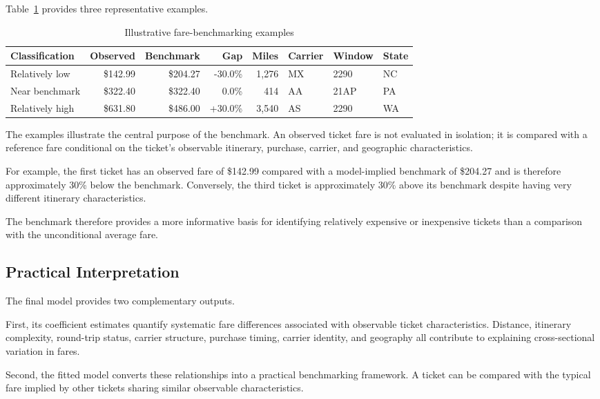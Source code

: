 \documentclass[11pt,a4paper]{article}
\begin{document}
Table~\ref{tab:benchmark-examples} provides three representative examples.

\begin{table}[H]
\centering
\caption{Illustrative fare-benchmarking examples}
\label{tab:benchmark-examples}
\small
\begin{tabular}{lrrrrlll}
\toprule
\textbf{Classification} & \textbf{Observed} & \textbf{Benchmark} & \textbf{Gap} & \textbf{Miles} & \textbf{Carrier} & \textbf{Window} & \textbf{State} \\
\midrule
Relatively low & \$142.99 & \$204.27 & -30.0\% & 1,276 & MX & 2290 & NC \\
Near benchmark & \$322.40 & \$322.40 & 0.0\% & 414 & AA & 21AP & PA \\
Relatively high & \$631.80 & \$486.00 & +30.0\% & 3,540 & AS & 2290 & WA \\
\bottomrule
\end{tabular}
\end{table}

The examples illustrate the central purpose of the benchmark. An observed ticket fare is not evaluated in isolation; it is compared with a reference fare conditional on the ticket's observable itinerary, purchase, carrier, and geographic characteristics.

For example, the first ticket has an observed fare of \$142.99 compared with a model-implied benchmark of \$204.27 and is therefore approximately 30\% below the benchmark. Conversely, the third ticket is approximately 30\% above its benchmark despite having very different itinerary characteristics.

The benchmark therefore provides a more informative basis for identifying relatively expensive or inexpensive tickets than a comparison with the unconditional average fare.

\subsection{Practical Interpretation}

The final model provides two complementary outputs.

First, its coefficient estimates quantify systematic fare differences associated with observable ticket characteristics. Distance, itinerary complexity, round-trip status, carrier structure, purchase timing, carrier identity, and geography all contribute to explaining cross-sectional variation in fares.

Second, the fitted model converts these relationships into a practical benchmarking framework. A ticket can be compared with the typical fare implied by other tickets sharing similar observable characteristics.
\end{document}
